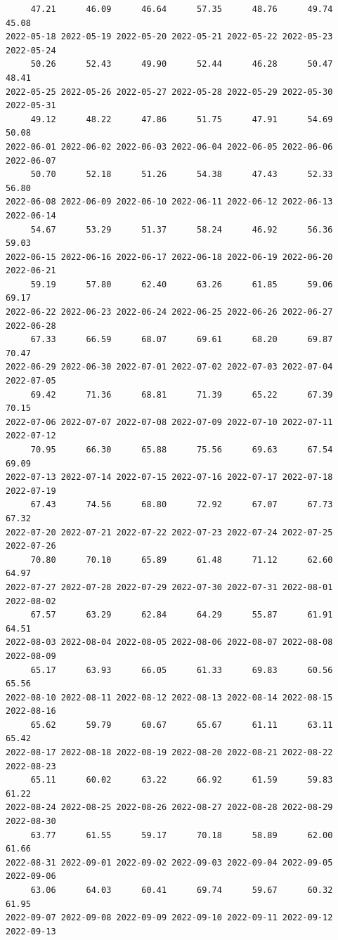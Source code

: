 \documentclass[
  letterpaper,
  DIV=11,
  numbers=noendperiod]{scrartcl}
\begin{document}
\begin{verbatim}
     47.21      46.09      46.64      57.35      48.76      49.74      45.08 
2022-05-18 2022-05-19 2022-05-20 2022-05-21 2022-05-22 2022-05-23 2022-05-24 
     50.26      52.43      49.90      52.44      46.28      50.47      48.41 
2022-05-25 2022-05-26 2022-05-27 2022-05-28 2022-05-29 2022-05-30 2022-05-31 
     49.12      48.22      47.86      51.75      47.91      54.69      50.08 
2022-06-01 2022-06-02 2022-06-03 2022-06-04 2022-06-05 2022-06-06 2022-06-07 
     50.70      52.18      51.26      54.38      47.43      52.33      56.80 
2022-06-08 2022-06-09 2022-06-10 2022-06-11 2022-06-12 2022-06-13 2022-06-14 
     54.67      53.29      51.37      58.24      46.92      56.36      59.03 
2022-06-15 2022-06-16 2022-06-17 2022-06-18 2022-06-19 2022-06-20 2022-06-21 
     59.19      57.80      62.40      63.26      61.85      59.06      69.17 
2022-06-22 2022-06-23 2022-06-24 2022-06-25 2022-06-26 2022-06-27 2022-06-28 
     67.33      66.59      68.07      69.61      68.20      69.87      70.47 
2022-06-29 2022-06-30 2022-07-01 2022-07-02 2022-07-03 2022-07-04 2022-07-05 
     69.42      71.36      68.81      71.39      65.22      67.39      70.15 
2022-07-06 2022-07-07 2022-07-08 2022-07-09 2022-07-10 2022-07-11 2022-07-12 
     70.95      66.30      65.88      75.56      69.63      67.54      69.09 
2022-07-13 2022-07-14 2022-07-15 2022-07-16 2022-07-17 2022-07-18 2022-07-19 
     67.43      74.56      68.80      72.92      67.07      67.73      67.32 
2022-07-20 2022-07-21 2022-07-22 2022-07-23 2022-07-24 2022-07-25 2022-07-26 
     70.80      70.10      65.89      61.48      71.12      62.60      64.97 
2022-07-27 2022-07-28 2022-07-29 2022-07-30 2022-07-31 2022-08-01 2022-08-02 
     67.57      63.29      62.84      64.29      55.87      61.91      64.51 
2022-08-03 2022-08-04 2022-08-05 2022-08-06 2022-08-07 2022-08-08 2022-08-09 
     65.17      63.93      66.05      61.33      69.83      60.56      65.56 
2022-08-10 2022-08-11 2022-08-12 2022-08-13 2022-08-14 2022-08-15 2022-08-16 
     65.62      59.79      60.67      65.67      61.11      63.11      65.42 
2022-08-17 2022-08-18 2022-08-19 2022-08-20 2022-08-21 2022-08-22 2022-08-23 
     65.11      60.02      63.22      66.92      61.59      59.83      61.22 
2022-08-24 2022-08-25 2022-08-26 2022-08-27 2022-08-28 2022-08-29 2022-08-30 
     63.77      61.55      59.17      70.18      58.89      62.00      61.66 
2022-08-31 2022-09-01 2022-09-02 2022-09-03 2022-09-04 2022-09-05 2022-09-06 
     63.06      64.03      60.41      69.74      59.67      60.32      61.95 
2022-09-07 2022-09-08 2022-09-09 2022-09-10 2022-09-11 2022-09-12 2022-09-13 

\end{verbatim}
\end{document}
